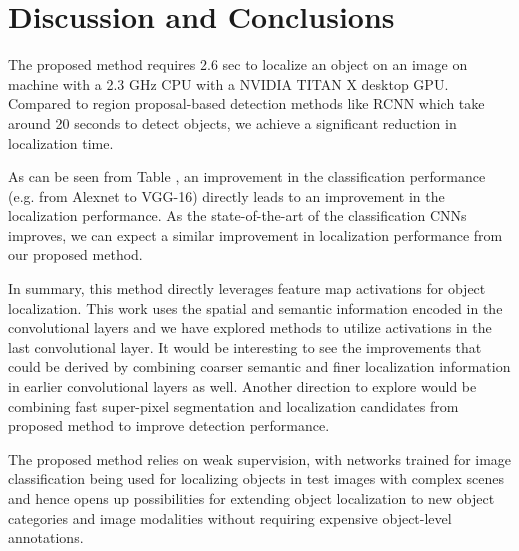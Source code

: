 \documentclass[runningheads]{llncs}
\begin{document}
\section{Discussion and Conclusions}\label{section:Discussion}
The proposed method requires 2.6 sec to localize an object on an image on machine with a 2.3 GHz CPU with a NVIDIA TITAN X desktop GPU. Compared to region proposal-based detection methods like RCNN which take around 20 seconds to detect objects, we achieve a significant reduction in localization time.

 As can be seen from Table , an improvement in the classification performance (e.g. from Alexnet to VGG-16) directly leads to an improvement in the localization performance. As the state-of-the-art of the classification CNNs improves, we can expect a similar improvement in localization performance from our proposed method.

In summary, this method directly leverages feature map activations for object localization. This work uses the spatial and semantic information encoded in the convolutional layers and we have explored methods to utilize activations in  the last convolutional layer. It would be interesting to see the improvements that could be derived by combining coarser semantic and finer localization information in earlier convolutional layers as well. Another direction to explore would be combining fast super-pixel segmentation and localization candidates from proposed method to improve detection performance.

The proposed method relies on weak supervision, with networks trained for image classification being used for localizing objects in test images with complex scenes and hence opens up possibilities for extending object localization to new object categories and image modalities without requiring expensive object-level annotations.



\clearpage
\end{document}
